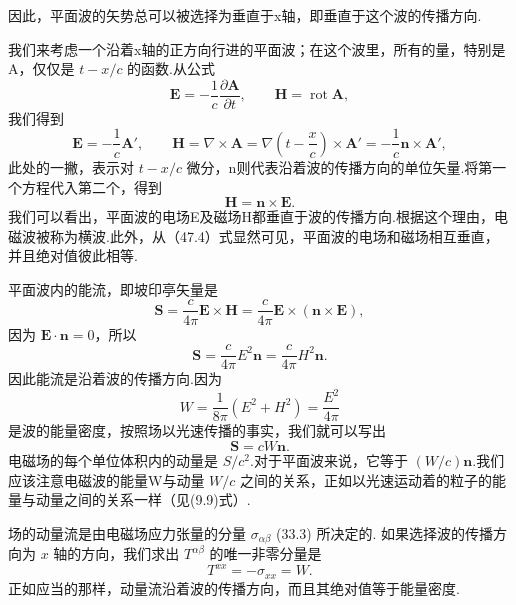 因此，平面波的矢势总可以被选择为垂直于x轴，即垂直于这个波的传播方向.

我们来考虑一个沿着x轴的正方向行进的平面波；在这个波里，所有的量，特别是A，仅仅是 $t - x/c$ 的函数.从公式
\begin{equation*}
  \boldsymbol{E}=-\frac{1}{c}\frac{\partial\boldsymbol{A}}{\partial t},
  \qquad\boldsymbol{H}=\operatorname{rot}\boldsymbol{A},
\end{equation*}
我们得到
\begin{equation}
  \boldsymbol{E}=-\frac{1}{c}\boldsymbol{A}',\qquad
  \boldsymbol{H}=\nabla\times\boldsymbol{A}
  =\nabla\left(t-\frac{x}{c}\right)\times\boldsymbol{A}'
  =-\frac{1}{c}\boldsymbol{n}\times\boldsymbol{A}',
\end{equation}
此处的一撇，表示对 $t - x/c$ 微分，n则代表沿着波的传播方向的单位矢量.将第一个方程代入第二个，得到
\begin{equation}
  \boldsymbol{H}=\boldsymbol{n}\times\boldsymbol{E}.
\end{equation}
我们可以看出，平面波的电场E及磁场H都垂直于波的传播方向.根据这个理由，电磁波被称为横波.此外，从（47.4）式显然可见，平面波的电场和磁场相互垂直，并且绝对值彼此相等.

平面波内的能流，即坡印亭矢量是
\begin{equation*}
  \boldsymbol{S}=\frac{c}{4\pi}\boldsymbol{E}\times\boldsymbol{H}
  =\frac{c}{4\pi}\boldsymbol{E}\times(\boldsymbol{n}\times\boldsymbol{E}),
\end{equation*}
因为 $\boldsymbol{E}\cdot\boldsymbol{n} = 0$，所以
\begin{equation*}
  \boldsymbol{S}=\frac{c}{4\pi}E^2\boldsymbol{n}
  =\frac{c}{4\pi}H^2\boldsymbol{n}.
\end{equation*}
因此能流是沿着波的传播方向.因为
\begin{equation*}
  W=\frac{1}{8\pi}(E^2+H^2)=\frac{E^2}{4\pi}
\end{equation*}
是波的能量密度，按照场以光速传播的事实，我们就可以写出
\begin{equation}
  \boldsymbol{S}=cW\boldsymbol{n}.
\end{equation}
电磁场的每个单位体积内的动量是 $S/c^2$.对于平面波来说，它等于 $(W/c)\boldsymbol{n}$.我们应该注意电磁波的能量W与动量 $W/c$ 之间的关系，正如以光速运动着的粒子的能量与动量之间的关系一样（见(9.9)式）.

场的动量流是由电磁场应力张量的分量 $\sigma_{\alpha\beta}$ (33.3) 所决定的. 如果选择波的传播方向为 $x$ 轴的方向，我们求出 $T^{\alpha\beta}$ 的唯一非零分量是
\begin{equation}
  T^{xx}=-\sigma_{xx}=W.
\end{equation}
正如应当的那样，动量流沿着波的传播方向，而且其绝对值等于能量密度.

